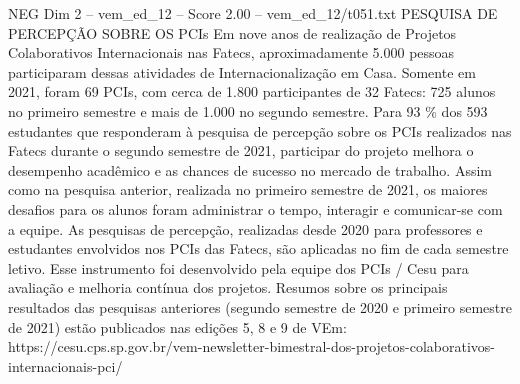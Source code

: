 \begin{textsample}{NEG Dim 2 – vem\_ed\_12 – Score 2.00 – vem\_ed\_12/t051.txt}  \label{ex:f2_neg_074}
PESQUISA DE PERCEPÇÃO SOBRE OS PCIs Em nove anos de realização de Projetos Colaborativos Internacionais nas Fatecs, aproximadamente 5.000 pessoas participaram dessas atividades de Internacionalização em Casa.
Somente em 2021, foram 69 PCIs, com cerca de 1.800 participantes de 32 Fatecs: 725 alunos no primeiro semestre e mais de 1.000 no segundo semestre.
Para 93 \% dos 593 estudantes que responderam à pesquisa de percepção sobre os PCIs realizados nas Fatecs durante o segundo semestre de 2021, participar do projeto melhora o desempenho acadêmico e as chances de sucesso no mercado de trabalho.
Assim como na pesquisa anterior, realizada no primeiro semestre de 2021, os maiores desafios para os alunos foram administrar o tempo, interagir e comunicar-se com a equipe.
As pesquisas de percepção, realizadas desde 2020 para professores e estudantes envolvidos nos PCIs das Fatecs, são aplicadas no fim de cada semestre letivo.
Esse instrumento foi desenvolvido pela equipe dos PCIs / Cesu para avaliação e melhoria contínua dos projetos.
Resumos sobre os principais resultados das pesquisas anteriores (segundo semestre de 2020 e primeiro semestre de 2021) estão publicados nas edições 5, 8 e 9 de VEm: https://cesu.cps.sp.gov.br/vem-newsletter-bimestral-dos-projetos-colaborativos-internacionais-pci/

\end{textsample}
